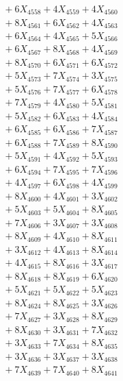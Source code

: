 \documentclass[a4paper,10pt]{article}
\begin{document}
{\begin{align}
&\;  + 6 X_{4558} + 4 X_{4559} + 4 X_{4560} \\[0.3ex]
&\;  + 8 X_{4561} + 6 X_{4562} + 4 X_{4563} \\[0.3ex]
&\;  + 6 X_{4564} + 4 X_{4565} + 5 X_{4566} \\[0.3ex]
&\;  + 6 X_{4567} + 8 X_{4568} + 4 X_{4569} \\[0.5ex]\allowbreak
&\;  + 8 X_{4570} + 6 X_{4571} + 6 X_{4572} \\[0.3ex]
&\;  + 5 X_{4573} + 7 X_{4574} + 3 X_{4575} \\[0.3ex]
&\;  + 5 X_{4576} + 7 X_{4577} + 6 X_{4578} \\[0.3ex]
&\;  + 7 X_{4579} + 4 X_{4580} + 5 X_{4581} \\[0.3ex]
&\;  + 5 X_{4582} + 6 X_{4583} + 4 X_{4584} \\[0.3ex]
&\;  + 6 X_{4585} + 6 X_{4586} + 7 X_{4587} \\[0.3ex]
&\;  + 6 X_{4588} + 7 X_{4589} + 8 X_{4590} \\[0.3ex]
&\;  + 5 X_{4591} + 4 X_{4592} + 5 X_{4593} \\[0.3ex]
&\;  + 6 X_{4594} + 7 X_{4595} + 7 X_{4596} \\[0.3ex]
&\;  + 4 X_{4597} + 6 X_{4598} + 4 X_{4599} \\[0.5ex]\allowbreak
&\;  + 8 X_{4600} + 4 X_{4601} + 3 X_{4602} \\[0.3ex]
&\;  + 5 X_{4603} + 5 X_{4604} + 8 X_{4605} \\[0.3ex]
&\;  + 7 X_{4606} + 3 X_{4607} + 3 X_{4608} \\[0.3ex]
&\;  + 8 X_{4609} + 4 X_{4610} + 8 X_{4611} \\[0.3ex]
&\;  + 3 X_{4612} + 4 X_{4613} + 8 X_{4614} \\[0.3ex]
&\;  + 4 X_{4615} + 8 X_{4616} + 3 X_{4617} \\[0.3ex]
&\;  + 8 X_{4618} + 8 X_{4619} + 6 X_{4620} \\[0.3ex]
&\;  + 5 X_{4621} + 5 X_{4622} + 5 X_{4623} \\[0.3ex]
&\;  + 8 X_{4624} + 8 X_{4625} + 3 X_{4626} \\[0.3ex]
&\;  + 7 X_{4627} + 3 X_{4628} + 8 X_{4629} \\[0.5ex]\allowbreak
&\;  + 8 X_{4630} + 3 X_{4631} + 7 X_{4632} \\[0.3ex]
&\;  + 3 X_{4633} + 7 X_{4634} + 8 X_{4635} \\[0.3ex]
&\;  + 3 X_{4636} + 3 X_{4637} + 3 X_{4638} \\[0.3ex]
&\;  + 7 X_{4639} + 7 X_{4640} + 8 X_{4641} \\[0.3ex]

\end{align}}
\end{document}
